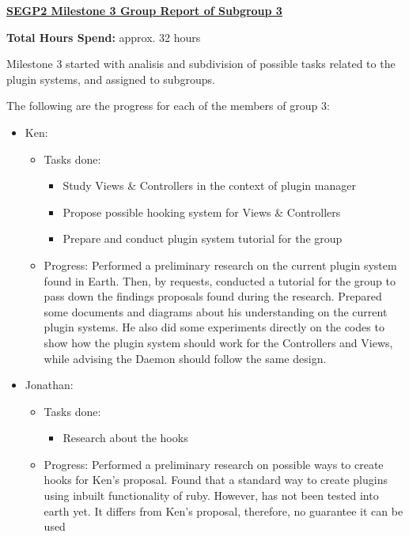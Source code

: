 \documentclass{letter}
\begin{document}
{\large \textbf{\underline{SEGP2 Milestone 3 Group Report of Subgroup 3}}}

\textbf{Total Hours Spend:} approx. 32 hours

Milestone 3 started with analisis and subdivision of possible tasks related to the plugin systems, and assigned to subgroups.

The following are the progress for each of the members of group 3:

\begin{itemize}
   \item Ken:
      \begin{itemize}
         \item Tasks done:
            \begin{itemize}
             \item Study Views \& Controllers in the context of plugin manager
             \item Propose possible hooking system for Views \& Controllers
             \item Prepare and conduct plugin system tutorial for the group
            \end{itemize}

         \item Progress: Performed a preliminary research on the current plugin system found in Earth. Then, by requests, conducted a tutorial for the group to pass down the findings proposals found during the research. Prepared some documents and diagrams about his understanding on the current plugin systems. He also did some experiments directly on the codes to show how the plugin system should work for the Controllers and Views, while advising the Daemon should follow the same design. 
      \end{itemize}

         
    \item Jonathan:
        \begin{itemize}
         \item Tasks done:
            \begin{itemize}
             \item Research about the hooks
             \end{itemize}
             
         \item Progress: Performed a preliminary research on possible ways to create hooks for Ken's proposal.  Found that a standard way to create plugins using inbuilt functionality of ruby.  However, has not been tested into earth yet.  It differs from Ken's proposal, therefore, no guarantee it can be used
        \end{itemize}
        

\end{itemize}
\end{document}
